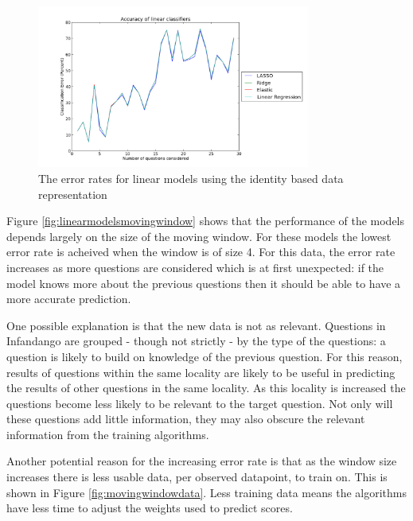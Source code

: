 \begin{figure}[h!]
\centering
\includegraphics[width=0.8\textwidth]{images/linearmodelsidentified.png}
\caption{The error rates for linear models using the identity based data representation}
\label{fig:linearmodelsidentified}
\end{figure}

Figure \ref{fig:linearmodelsmovingwindow} shows that the performance of the models depends largely on the size of the moving window. For these models the lowest error rate is acheived when the window is of size 4. For this data, the error rate increases as more questions are considered which is at first unexpected: if the model knows more about the previous questions then it should be able to have a more accurate prediction. 

One possible explanation is that the new data is not as relevant. Questions in Infandango are grouped - though not strictly - by the type of the questions: a question is likely to build on knowledge of the previous question. For this reason, results of questions within the same locality are likely to be useful in predicting the results of other questions in the same locality. As this locality is increased the questions become less likely to be relevant to the target question. Not only will these questions add little information, they may also obscure the relevant information from the training algorithms.

Another potential reason for the increasing error rate is that as the window size increases there is less usable data, per observed datapoint, to train on. This is shown in Figure \ref{fig:movingwindowdata}. Less training data means the algorithms have less time to adjust the weights used to predict scores.

